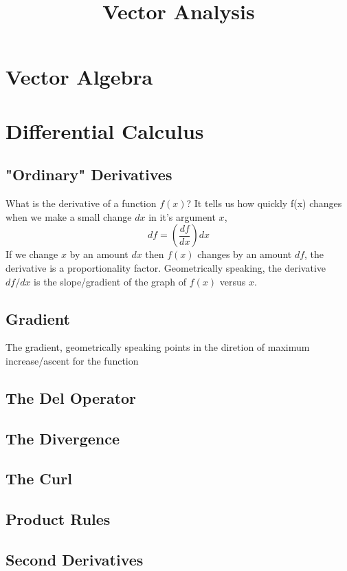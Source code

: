 \documentclass[]{article}
\title{Vector Analysis}
\author{}
\begin{document}
\maketitle


\section{Vector Algebra}


\section{Differential Calculus}
\subsection{"Ordinary" Derivatives}
What is the derivative of a function $f(x)$? It tells us how quickly f(x) changes when we make a small change $dx$ in it's argument $x$,
\begin{equation}
df = \left(\frac{df}{dx}\right) dx
\end{equation}
If we change $x$ by an amount $dx$ then $f(x)$ changes by an amount $df$, the derivative is a proportionality factor. Geometrically speaking, the derivative $df/dx$ is the slope/gradient of the graph of $f(x)$ versus $x$. 
\subsection{Gradient}
The gradient, geometrically speaking points in the diretion of maximum increase/ascent for the function 
\subsection{The Del Operator}
\subsection{The Divergence}
\subsection{The Curl}
\subsection{Product Rules}
\subsection{Second Derivatives}
\end{document}
